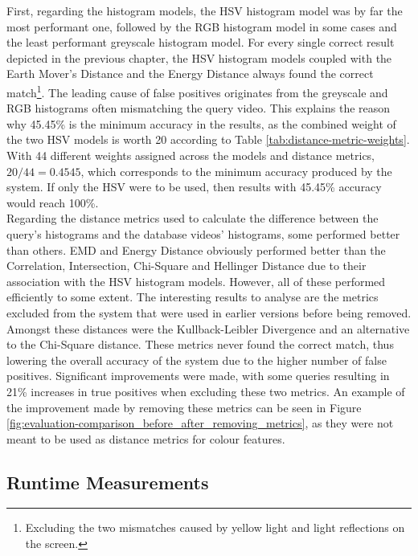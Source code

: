 First, regarding the histogram models, the HSV histogram model was by far the most performant one, followed by the RGB histogram model in some cases and the least performant greyscale histogram model. For every single correct result depicted in the previous chapter, the HSV histogram models coupled with the Earth Mover's Distance and the Energy Distance always found the correct match\footnote{Excluding the two mismatches caused by yellow light and light reflections on the screen.}. The leading cause of false positives originates from the greyscale and RGB histograms often mismatching the query video. This explains the reason why 45.45\% is the minimum accuracy in the results, as the combined weight of the two HSV models is worth 20 according to Table \ref{tab:distance-metric-weights}. With 44 different weights assigned across the models and distance metrics, $20/44=0.4545$, which corresponds to the minimum accuracy produced by the system. If only the HSV were to be used, then results with 45.45\% accuracy would reach 100\%.\\

Regarding the distance metrics used to calculate the difference between the query's histograms and the database videos' histograms, some performed better than others. EMD and Energy Distance obviously performed better than the Correlation, Intersection, Chi-Square and Hellinger Distance due to their association with the HSV histogram models. However, all of these performed efficiently to some extent. The interesting results to analyse are the metrics excluded from the system that were used in earlier versions before being removed. Amongst these distances were the Kullback-Leibler Divergence and an alternative to the Chi-Square distance. These metrics never found the correct match, thus lowering the overall accuracy of the system due to the higher number of false positives. Significant improvements were made, with some queries resulting in 21\% increases in true positives when excluding these two metrics. An example of the improvement made by removing these metrics can be seen in Figure \ref{fig:evaluation-comparison_before_after_removing_metrics}, as they were not meant to be used as distance metrics for colour features. 


\subsection{Runtime Measurements}

